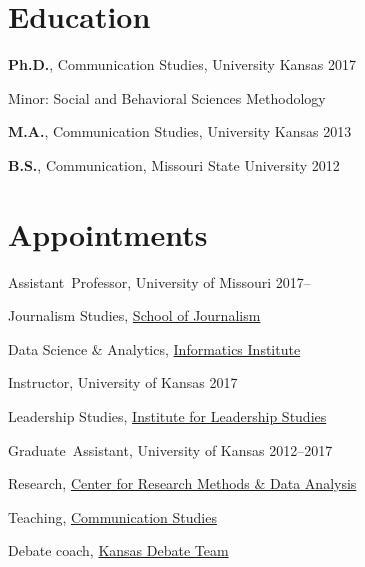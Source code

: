 \documentclass[11pt,letterpaper]{article}
\begin{document}


\section{Education}
\textbf{Ph.D.}, Communication Studies, University Kansas \hfill 2017
  \begin{outerlist}
    \item[] Minor: Social and Behavioral Sciences Methodology
  \end{outerlist} \vspace{.175in}

\textbf{M.A.}, Communication Studies, University Kansas \hfill 2013

\vspace{.15in}

\textbf{B.S.}, Communication, Missouri State University \hfill 2012

\section{Appointments}
Assistant~Professor, University of Missouri \hfill 2017--
  \begin{outerlist}
    \item[] Journalism Studies, \href{http://journalism.missouri.edu}{School of Journalism}
    \item[] Data Science \& Analytics, \href{https://muii.missouri.edu/}{Informatics Institute}
  \end{outerlist}\vspace{.2in}

Instructor, University of Kansas \hfill 2017
  \begin{outerlist}
    \item[] Leadership Studies, \href{https://ils.ku.edu/about}{Institute for Leadership Studies}
  \end{outerlist}\vspace{.2in}

Graduate~Assistant, University of Kansas \hfill 2012--2017
  \begin{outerlist}
    \item[] Research, \href{http://www.crmda.ku.edu/}{Center for Research Methods \& Data Analysis}
    \item[] Teaching, \href{http://www.coms.ku.edu/}{Communication Studies}
    \item[] Debate coach, \href{http://www.debate.ku.edu/}{Kansas Debate Team}
  \end{outerlist}
\end{document}
